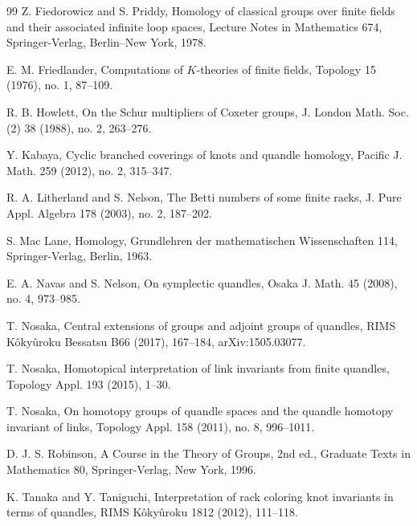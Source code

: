 \documentclass[11pt]{article}
\begin{document}
\begin{thebibliography}{99}
Z. Fiedorowicz and S. Priddy,
\newblock Homology of classical groups over finite fields and their associated infinite loop spaces,
\newblock Lecture Notes in Mathematics 674,
\newblock Springer-Verlag, Berlin--New York, 1978.

E. M. Friedlander,
\newblock Computations of $K$-theories of finite fields,
\newblock Topology 15 (1976), no. 1, 87--109.

R. B. Howlett,
\newblock On the Schur multipliers of Coxeter groups,
\newblock J. London Math. Soc. (2) 38 (1988), no. 2, 263--276.

Y. Kabaya,
\newblock Cyclic branched coverings of knots and quandle homology,
\newblock Pacific J. Math. 259 (2012), no. 2, 315--347.

R. A. Litherland and S. Nelson,
\newblock The Betti numbers of some finite racks,
\newblock J. Pure Appl. Algebra 178 (2003), no. 2, 187--202.

S. Mac Lane,
\newblock Homology,
\newblock Grundlehren der mathematischen Wissenschaften 114,
\newblock Springer-Verlag, Berlin, 1963.

E. A. Navas and S. Nelson,
\newblock On symplectic quandles,
\newblock Osaka J. Math. 45 (2008), no. 4, 973--985.

T. Nosaka,
\newblock Central extensions of groups and adjoint groups of quandles,
\newblock RIMS K\^oky\^uroku Bessatsu B66 (2017), 167--184,
\newblock arXiv:1505.03077.

T. Nosaka,
\newblock Homotopical interpretation of link invariants from finite quandles,
\newblock Topology Appl. 193 (2015), 1--30.

T. Nosaka,
\newblock On homotopy groups of quandle spaces and the quandle homotopy invariant of links,
\newblock Topology Appl. 158 (2011), no. 8, 996--1011.

D. J. S. Robinson,
\newblock A Course in the Theory of Groups,
\newblock 2nd ed., Graduate Texts in Mathematics 80,
\newblock Springer-Verlag, New York, 1996.

K. Tanaka and Y. Taniguchi,
\newblock Interpretation of rack coloring knot invariants in terms of quandles,
\newblock RIMS K\^oky\^uroku 1812 (2012), 111--118.

\end{thebibliography}
\end{document}

